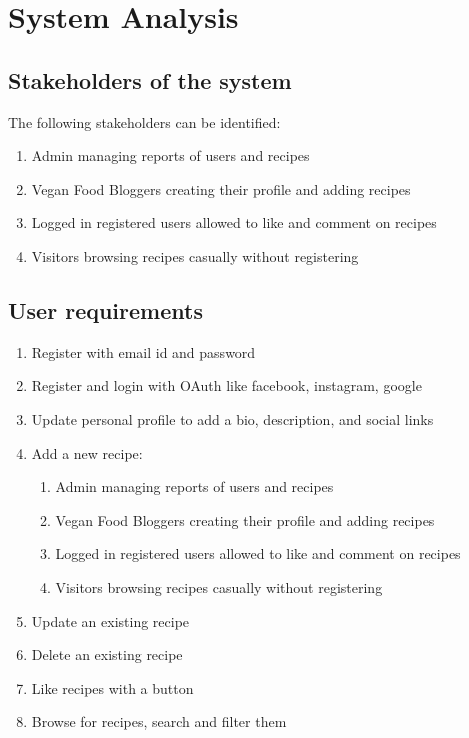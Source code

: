 %
%
\chapter{System Analysis}%
%
\label{chapter:system_analysis}

\section{Stakeholders of the system}
The following stakeholders can be identified:

\begin{enumerate}
  \item Admin managing reports of users and recipes
  \item Vegan Food Bloggers creating their profile and adding recipes
  \item Logged in registered users allowed to like and comment on recipes
  \item Visitors browsing recipes casually without registering
\end{enumerate}

\section{User requirements}

\begin{enumerate}
  \item Register with email id and password
  \item Register and login with OAuth like facebook, instagram, google
  \item Update personal profile to add a bio, description, and social links
  \item Add a new recipe:
    \begin{enumerate}[label=\alph*]
      \item Admin managing reports of users and recipes
      \item Vegan Food Bloggers creating their profile and adding recipes
      \item Logged in registered users allowed to like and comment on recipes
      \item Visitors browsing recipes casually without registering
    \end{enumerate}
  \item Update an existing recipe
  \item Delete an existing recipe
  \item Like recipes with a button
  \item Browse for recipes, search and filter them
\end{enumerate}

